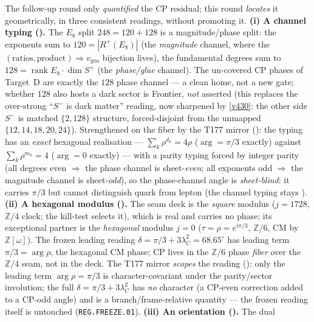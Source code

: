 \documentclass[11pt,a4paper]{article}
\newcommand{\vgeo}{v_{\mathrm{geo}}}
\providecommand{\Z}{\mathbb{Z}}
\begin{document}
\begin{winbox}
The follow-up round only \emph{quantified} the CP residual; this round \emph{locates} it geometrically,
in three consistent readings, without promoting it. \textbf{(i) A channel typing
().} The $E_8$ split $248=120+128$ is a
magnitude/phase split: the exponents sum to $120=|R^+(E_8)|$ (the \emph{magnitude} channel, where the
$(\text{ratios},\text{product})\Rightarrow\vgeo$ bijection lives), the fundamental degrees sum to
$128=\operatorname{rank}E_8\cdot\dim S^+$ (the \emph{phase/glue} channel). The un-covered CP phases of
Target~D are exactly the $128$ phase channel --- a clean home, not a new gate; whether $128$ also hosts a
dark sector is Frontier, \emph{not} asserted (this replaces the over-strong ``$S^-$ is dark matter''
reading, now sharpened by \vref{v430}: the other side $S^-$ is matched $\{2,128\}$ structure, forced-disjoint from the unmapped $\{12,14,18,20,24\}$).
Strengthened on the fiber by the T177 mirror (): the typing has
an \emph{exact} hexagonal realisation --- $\sum_k\rho^{d_k}=4\rho$ ($\arg=\pi/3$ exactly) against
$\sum_k\rho^{m_k}=4$ ($\arg=0$ exactly) --- with a parity typing forced by integer parity (all degrees
even $\Rightarrow$ the phase channel is sheet-\emph{even}; all exponents odd $\Rightarrow$ the
magnitude channel is sheet-\emph{odd}), so the phase-channel angle is \emph{sheet-blind}: it carries
$\pi/3$ but cannot distinguish quark from lepton (the channel typing stays \mC). \textbf{(ii) A hexagonal modulus ().} The seam
deck is the \emph{square} modulus ($j{=}1728$, $\Z/4$ clock; the kill-test selects it), which is real and
carries no phase; its exceptional partner is the \emph{hexagonal} modulus $j{=}0$ ($\tau{=}\rho{=}e^{i\pi/3}$,
$\Z/6$, CM by $\Z[\omega]$). The frozen leading reading $\delta=\pi/3+3\lambda_C^2=68.65^\circ$ has leading
term $\pi/3=\arg\rho$, the hexagonal CM phase; CP lives in the $\Z/6$ phase \emph{fiber} over the $\Z/4$ seam,
not in the deck. The T177 mirror \emph{scopes} the reading ():
only the leading term $\arg\rho=\pi/3$ is character-covariant under the parity/sector involution; the
full $\delta=\pi/3+3\lambda_C^2$ has \emph{no} character (a CP-even correction added to a CP-odd
angle) and is a branch/frame-relative quantity --- the frozen reading itself is untouched
(\texttt{REG.FREEZE.01}). \textbf{(iii) An orientation ().} The dual

\end{winbox}
\end{document}
